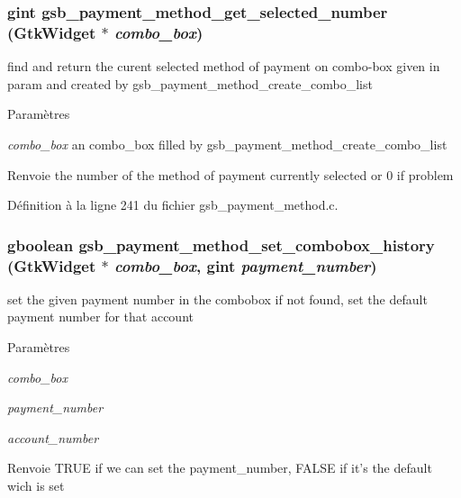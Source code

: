\subsubsection[{gsb\_\-payment\_\-method\_\-get\_\-selected\_\-number}]{\setlength{\rightskip}{0pt plus 5cm}gint gsb\_\-payment\_\-method\_\-get\_\-selected\_\-number (GtkWidget $\ast$ {\em combo\_\-box})}\label{gsb__payment__method_8c_ae98cce0ba13ed710ed1f287915ba9acb}
find and return the curent selected method of payment on combo-\/box given in param and created by gsb\_\-payment\_\-method\_\-create\_\-combo\_\-list


\begin{DoxyParams}{Paramètres}
\item[{\em combo\_\-box}]an combo\_\-box filled by gsb\_\-payment\_\-method\_\-create\_\-combo\_\-list\end{DoxyParams}
\begin{DoxyReturn}{Renvoie}
the number of the method of payment currently selected or 0 if problem 
\end{DoxyReturn}


Définition à la ligne 241 du fichier gsb\_\-payment\_\-method.c.

\subsubsection[{gsb\_\-payment\_\-method\_\-set\_\-combobox\_\-history}]{\setlength{\rightskip}{0pt plus 5cm}gboolean gsb\_\-payment\_\-method\_\-set\_\-combobox\_\-history (GtkWidget $\ast$ {\em combo\_\-box}, \/  gint {\em payment\_\-number})}\label{gsb__payment__method_8c_a90ac47cc6325eaee622f9357d3b65f68}
set the given payment number in the combobox if not found, set the default payment number for that account


\begin{DoxyParams}{Paramètres}
\item[{\em combo\_\-box}]\item[{\em payment\_\-number}]\item[{\em account\_\-number}]\end{DoxyParams}
\begin{DoxyReturn}{Renvoie}
TRUE if we can set the payment\_\-number, FALSE if it's the default wich is set 
\end{DoxyReturn}


